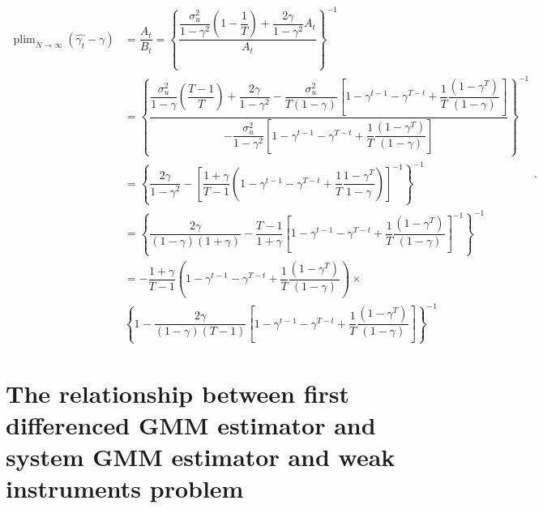 \documentclass[12pt,a4paper,hyperref]{article}
\DeclareMathOperator*{\plim}{plim}
\begin{document}
\begin{equation}
\begin{split}
\plim_{N\rightarrow \infty}(\hat{\gamma_{t}}-\gamma )&=\dfrac{A_{t}}{B_{t}}=\left\lbrace \dfrac{\dfrac{\sigma^{2}_{u}}{1-\gamma^{2}}\left(1-\dfrac{1}{T} \right)+\dfrac{2\gamma}{1-\gamma^{2}}A_{t}}{A_{t}} \right\rbrace^{-1} \\
&=\left\lbrace \dfrac{\dfrac{\sigma^{2}_{u}}{1-\gamma}\left( \dfrac{T-1}{T}\right)+\dfrac{2\gamma}{1-\gamma^{2}}-\dfrac{\sigma^{2}_{u}}{T\left( 1-\gamma\right)}\left[ 1-\gamma^{t-1}-\gamma^{T-t}+\dfrac{1}{T}\dfrac{\left(1-\gamma^{T}\right)}{\left(1-\gamma \right)}\right]}
{-\dfrac{\sigma^{2}_{u}}{1-\gamma^{2}}\left[ 1-\gamma^{t-1}-\gamma^{T-t}+\dfrac{1}{T}\dfrac{\left(1-\gamma^{T} \right)}{\left( 1-\gamma\right)}\right] } \right\rbrace^{-1} \\
&=\left\lbrace \dfrac{2\gamma}{1-\gamma^{2}}-\left[
\dfrac{1+\gamma}{T-1} ( 1-\gamma^{t-1}-\gamma^{T-t}+\dfrac{1}{T} \dfrac{1-\gamma^{T}}{1-\gamma} ) \right]^{-1}
\right\rbrace^{-1} \\
&=\left\lbrace \dfrac{2\gamma}{\left( 1-\gamma\right)\left( 1+\gamma\right)}-\dfrac{T-1}{1+\gamma}\left[ 1-\gamma^{t-1}-\gamma^{T-t}+\dfrac{1}{T}\dfrac{\left(1-\gamma^{T} \right)}{\left(1-\gamma \right)} \right]^{-1}     \right\rbrace^{-1} \\
&= -\dfrac{1+\gamma}{T-1}\left(1-\gamma^{t-1}-\gamma^{T-t}+\dfrac{1}{T}\dfrac{\left(1-\gamma^{T}\right)}{\left( 1-\gamma\right)}   \right)\times \\
&\left\lbrace 1-\dfrac{2\gamma}{\left(1-\gamma \right) \left(T-1 \right)}\left[ 1-\gamma^{t-1}-\gamma^{T-t}+\dfrac{1}{T}\dfrac{\left( 1-\gamma^{T}\right)}{\left(1-\gamma \right)}\right]    \right\rbrace^{-1} 
\end{split}.
\end{equation}
\section{The relationship between first differenced GMM estimator and system GMM estimator and weak instruments problem} \label{B}
\end{document}
